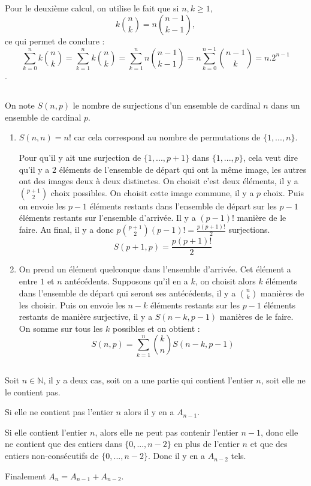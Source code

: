 \documentclass[10pt,a4paper]{article}
\begin{document}
\noindent
Pour le deuxième calcul, on utilise le fait que si $n,k\geqslant 1$,
$$k\binom{n}{k}=n\binom{n-1}{k-1},$$
ce qui permet de conclure :
$$\sum\limits_{k=0}^nk\binom{n}{k}=\sum\limits_{k=1}^nk\binom{n}{k}=\sum\limits_{k=1}^nn\binom{n-1}{k-1}=n\sum\limits_{k=0}^{n-1}\binom{n-1}{k}=n.2^{n-1}$$.
\subsection{}
On note $S(n,p)$ le nombre de surjections d'un ensemble de cardinal $n$ dans un ensemble de cardinal $p$.
\begin{enumerate}
\item $S(n,n)=n!$ car cela correspond au nombre de permutations de $\{1,...,n\}$.

Pour qu'il y ait une surjection de $\{1,...,p+1\}$ dans $\{1,...,p\}$, cela veut dire qu'il y a $2$ éléments de l'ensemble de départ qui ont la même image, 
les autres ont des images deux à deux distinctes. On choisit c'est deux éléments, il y a $\binom{p+1}{2}$ choix possibles. On choisit cette image commune,
il y a $p$ choix. Puis on envoie les $p-1$ éléments restants dans l'ensemble de départ sur les $p-1$ éléments restants sur l'ensemble d'arrivée. Il y a 
$(p-1)!$ manière de le faire. Au final, il y a donc $p\binom{p+1}{2}(p-1)!=\frac{p(p+1)!}{2}$ surjections.
$$\boxed{S(p+1,p)=\frac{p(p+1)!}{2}}$$
\item On prend un élément quelconque dans l'ensemble d'arrivée. Cet élément a entre $1$ et $n$ antécédents. Supposons qu'il en a $k$, on choisit alors 
$k$ éléments dans l'ensemble de départ qui seront ses antécédents, il y a $\binom{n}{k}$ manières de les choisir. Puis on envoie les $n-k$ éléments restants
sur les $p-1$ éléments restants de manière surjective, il y a $S(n-k,p-1)$ manières de le faire. On somme sur tous les $k$ possibles et on obtient :
$$\boxed{S(n,p)=\sum\limits_{k=1}^n\binom{k}{n}S(n-k,p-1)}$$
\end{enumerate}
\subsection{}
Soit $n\in\mathbb{N}$, il y a deux cas, soit on a une partie qui contient l'entier $n$, soit elle ne le contient pas.

Si elle ne contient pas l'entier $n$ alors il y en a $A_{n-1}$.

Si elle contient l'entier $n$, alors elle ne peut pas contenir l'entier $n-1$, donc elle ne contient que des entiers dans $\{0,...,n-2\}$ en plus de l'entier
 $n$ et que des entiers non-consécutifs de $\{0,...,n-2\}$. Donc il y en a $A_{n-2}$ tels.

Finalement $A_n=A_{n-1}+A_{n-2}$.
\end{document}
